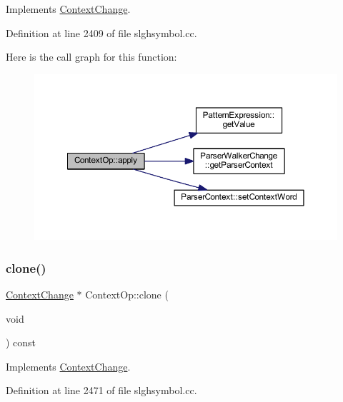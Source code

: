 Implements \mbox{\hyperlink{class_context_change_a969bb7f403bf3a60f1fff0948ba84eeb}{Context\+Change}}.



Definition at line 2409 of file slghsymbol.\+cc.

Here is the call graph for this function\+:
\nopagebreak
\begin{figure}[H]
\begin{center}
\leavevmode
\includegraphics[width=350pt]{class_context_op_aaaa3a32d48b60c9b3eef69a00b9cba2c_cgraph}
\end{center}
\end{figure}
\mbox{\label{class_context_op_a157a525c2c9db4f2cd01cb0dc579963e}} 
\subsubsection{\texorpdfstring{clone()}{clone()}}
{\footnotesize\ttfamily \mbox{\hyperlink{class_context_change}{Context\+Change}} $\ast$ Context\+Op\+::clone (\begin{DoxyParamCaption}\item[{void}]{ }\end{DoxyParamCaption}) const\hspace{0.3cm}{\ttfamily [virtual]}}



Implements \mbox{\hyperlink{class_context_change_ab1e858b15bc17c5dc375d5cda51dfeea}{Context\+Change}}.



Definition at line 2471 of file slghsymbol.\+cc.

